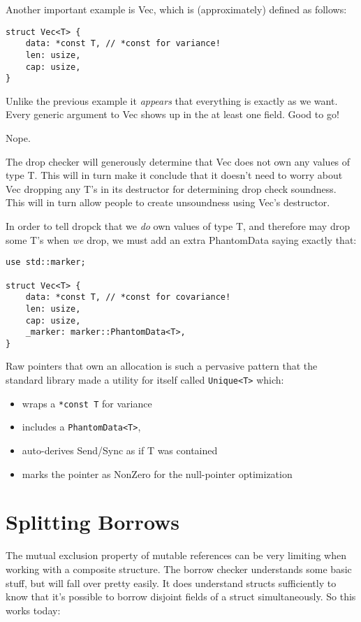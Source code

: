 \documentclass[a4paper,]{book}
\providecommand{\tightlist}{%
  \setlength{\itemsep}{0pt}\setlength{\parskip}{0pt}}
\begin{document}
Another important example is Vec, which is (approximately) defined as
follows:

\begin{verbatim}
struct Vec<T> {
    data: *const T, // *const for variance!
    len: usize,
    cap: usize,
}
\end{verbatim}

Unlike the previous example it \emph{appears} that everything is exactly
as we want. Every generic argument to Vec shows up in the at least one
field. Good to go!

Nope.

The drop checker will generously determine that Vec does not own any
values of type T. This will in turn make it conclude that it doesn't
need to worry about Vec dropping any T's in its destructor for
determining drop check soundness. This will in turn allow people to
create unsoundness using Vec's destructor.

In order to tell dropck that we \emph{do} own values of type T, and
therefore may drop some T's when \emph{we} drop, we must add an extra
PhantomData saying exactly that:

\begin{verbatim}
use std::marker;

struct Vec<T> {
    data: *const T, // *const for covariance!
    len: usize,
    cap: usize,
    _marker: marker::PhantomData<T>,
}
\end{verbatim}

Raw pointers that own an allocation is such a pervasive pattern that the
standard library made a utility for itself called
\texttt{Unique\textless{}T\textgreater{}} which:

\begin{itemize}
\tightlist
\item
  wraps a \texttt{*const\ T} for variance
\item
  includes a \texttt{PhantomData\textless{}T\textgreater{}},
\item
  auto-derives Send/Sync as if T was contained
\item
  marks the pointer as NonZero for the null-pointer optimization
\end{itemize}

\section{Splitting Borrows}\label{sec--borrow-splitting}

The mutual exclusion property of mutable references can be very limiting
when working with a composite structure. The borrow checker understands
some basic stuff, but will fall over pretty easily. It does understand
structs sufficiently to know that it's possible to borrow disjoint
fields of a struct simultaneously. So this works today:
\end{document}
